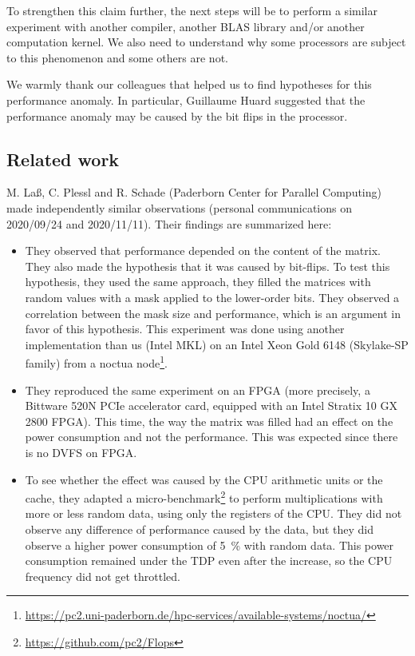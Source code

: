             To strengthen this claim further, the next steps will be to perform a similar experiment with another
            compiler, another BLAS library and/or another computation kernel. We also need to understand why some
            processors are subject to this phenomenon and some others are not.

            We warmly thank our colleagues that helped us to find hypotheses for this performance anomaly. In
            particular, Guillaume Huard suggested that the performance anomaly may be caused by the bit flips in the
            processor.

        \subsection{Related work}%
            M. La{\ss}, C. Plessl and R. Schade (Paderborn Center for Parallel Computing) made independently similar
            observations (personal communications on 2020/09/24 and 2020/11/11). Their findings are summarized here:
            \begin{itemize}
                \item They observed that \dgemm performance depended on the content of the matrix. They also
                    made the hypothesis that it was caused by bit-flips. To test this hypothesis, they used the same
                    approach, they filled the matrices with random values with a mask applied to the lower-order bits.
                    They observed a correlation between the mask size and \dgemm performance, which is an
                    argument in favor of this hypothesis. This experiment was done using another \dgemm
                    implementation than us (Intel MKL) on an Intel Xeon Gold 6148 (Skylake-SP family) from a noctua
                    node\footnote{\url{https://pc2.uni-paderborn.de/hpc-services/available-systems/noctua/}}.
                \item They reproduced the same experiment on an FPGA (more precisely, a Bittware 520N PCIe accelerator
                    card, equipped with an Intel Stratix 10 GX 2800 FPGA). This time, the way the matrix was filled had
                    an effect on the power consumption and not the performance. This was expected since there is no DVFS
                    on FPGA.
                \item To see whether the effect was caused by the CPU arithmetic units or the cache, they adapted a
                    micro-benchmark\footnote{\url{https://github.com/pc2/Flops}} to perform multiplications with more or
                    less random data, using only the registers of the CPU. They did not observe any difference of
                    performance caused by the data, but they did observe a higher power consumption of \SI{5}{\percent}
                    with random data. This power consumption remained under the TDP even after the increase, so the CPU
                    frequency did not get throttled.
            \end{itemize}

